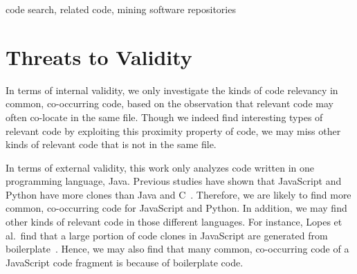 \documentclass[conference]{IEEEtran}
\begin{document}
\begin{abstract}

\end{abstract}

\begin{IEEEkeywords}
code search, related code, mining software repositories
\end{IEEEkeywords}










\section{Threats to Validity}
In terms of internal validity, we only investigate the kinds of code relevancy in common, co-occurring code, based on the observation that relevant code may often co-locate in the same file. Though we indeed find interesting types of relevant code by exploiting this proximity property of code, we may miss other kinds of relevant code that is not in the same file. 

In terms of external validity, this work only analyzes code written in one programming language, Java. Previous studies have shown that JavaScript and Python have more clones than Java and C~\cite{lopes2017dejavu, yang2017stack}. Therefore, we are likely to find more common, co-occurring code for JavaScript and Python. In addition,  we may find other kinds of relevant code in those different languages. For instance, Lopes et al.~find that a large portion of code clones in JavaScript are generated from boilerplate~\cite{lopes2017dejavu}. Hence, we may also find that many common, co-occurring code of a JavaScript code fragment is because of boilerplate code.
\end{document}
